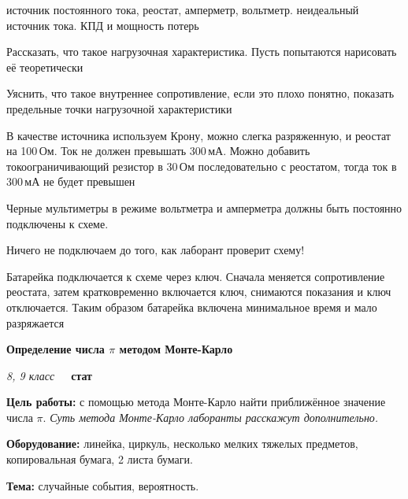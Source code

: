 \documentclass[a4paper,10pt]{article}
\newcommand{\labtitle}[7]{
	\textbf{#2}\par
	\textit{#1 класс}~~~\textbf{#3}\par
	\textbf{Цель работы:} #4\par
	\textbf{Оборудование:} #5\par
	\textbf{Тема:} #6
}
\begin{document}
\begin{enumerate}
		{источник постоянного тока, реостат, амперметр, вольтметр.}
		{неидеальный источник тока. КПД и мощность потерь}
		{\item Рассказать, что такое нагрузочная характеристика. Пусть попытаются нарисовать её теоретически
		\item Уяснить, что такое внутреннее сопротивление, если это плохо понятно, показать предельные точки нагрузочной характеристики
		\item В качестве источника используем Крону, можно слегка разряженную, и реостат на 100\,Ом. Ток не должен превышать 300\,мА. Можно добавить токоограничивающий резистор в 30\,Ом последовательно с реостатом, тогда ток в 300\,мА не будет превышен
		\item Черные мультиметры в режиме вольтметра и амперметра должны быть постоянно подключены к схеме.
		\item Ничего не подключаем до того, как лаборант проверит схему!
		\item Батарейка подключается к схеме через ключ. Сначала меняется сопротивление реостата, затем кратковременно включается ключ, снимаются показания и ключ отключается. Таким образом батарейка включена минимальное время и мало разряжается}
	\item \labtitle
		{8, 9}
		{Определение числа $\pi$ методом Монте-Карло}
		{стат}
		{с помощью метода Монте-Карло найти приближённое значение числа $\pi$. \textit{Суть метода Монте-Карло лаборанты расскажут дополнительно.}}
		{линейка, циркуль, несколько мелких тяжелых предметов, копировальная бумага, 2 листа бумаги.}
		{случайные события, вероятность.}
		{\item Основная идея "--- при помощи физического процесса мы генерируем равномерно распределенные точки на листе бумаги. Кладём в ящик лист, накрываем копировальной бумагой, закрепляем, насыпаем дробь и трясем. Варианты исполнения могут быть разные. Строим на листе бумаги круг и квадрат и по отношению количества точек определяем отношение площадей, откуда число $\pi$.
		\item Какие преимущества метод Монте-Карло имеет перед тем, чтобы просто построить круг на миллиметровке и посчитать площадь. }
	\item \labtitle

\end{enumerate}
\end{document}
